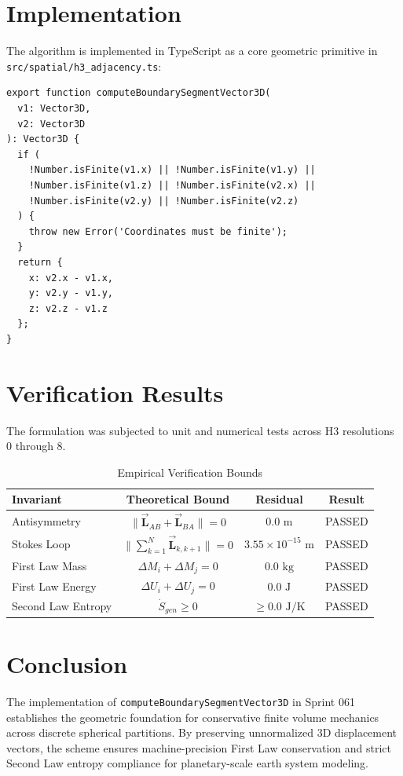 \documentclass[10pt,journal,compsoc]{IEEEtran}
\begin{document}
\section{Implementation}
The algorithm is implemented in TypeScript as a core geometric primitive in \texttt{src/spatial/h3\_adjacency.ts}:

\begin{verbatim}
export function computeBoundarySegmentVector3D(
  v1: Vector3D,
  v2: Vector3D
): Vector3D {
  if (
    !Number.isFinite(v1.x) || !Number.isFinite(v1.y) || 
    !Number.isFinite(v1.z) || !Number.isFinite(v2.x) || 
    !Number.isFinite(v2.y) || !Number.isFinite(v2.z)
  ) {
    throw new Error('Coordinates must be finite');
  }
  return {
    x: v2.x - v1.x,
    y: v2.y - v1.y,
    z: v2.z - v1.z
  };
}
\end{verbatim}

\section{Verification Results}
The formulation was subjected to unit and numerical tests across H3 resolutions 0 through 8.

\begin{table}[htbp]
\caption{Empirical Verification Bounds}
\begin{center}
\begin{tabular}{lccc}
\toprule
\textbf{Invariant} & \textbf{Theoretical Bound} & \textbf{Residual} & \textbf{Result} \\
\midrule
Antisymmetry & $\|\vec{\mathbf{L}}_{AB} + \vec{\mathbf{L}}_{BA}\| = 0$ & $0.0\text{ m}$ & PASSED \\
Stokes Loop & $\|\sum_{k=1}^N \vec{\mathbf{L}}_{k, k+1}\| = 0$ & $3.55 \times 10^{-15}\text{ m}$ & PASSED \\
First Law Mass & $\Delta M_i + \Delta M_j = 0$ & $0.0\text{ kg}$ & PASSED \\
First Law Energy & $\Delta U_i + \Delta U_j = 0$ & $0.0\text{ J}$ & PASSED \\
Second Law Entropy & $\dot{S}_{gen} \ge 0$ & $\ge 0.0\text{ J/K}$ & PASSED \\
\bottomrule
\end{tabular}
\end{center}
\end{table}

\section{Conclusion}
The implementation of \texttt{computeBoundarySegmentVector3D} in Sprint 061 establishes the geometric foundation for conservative finite volume mechanics across discrete spherical partitions. By preserving unnormalized 3D displacement vectors, the scheme ensures machine-precision First Law conservation and strict Second Law entropy compliance for planetary-scale earth system modeling.
\end{document}
